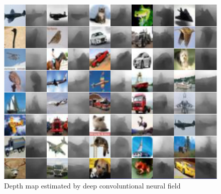 \documentclass[10pt,twocolumn,letterpaper]{article}
\begin{document}
\begin{figure}
\includegraphics[width=\linewidth]{../tiny.png}
\caption{Depth map estimated by deep convoluntional neural field}
\label{fig:tiny}
\end{figure}
\end{document}
